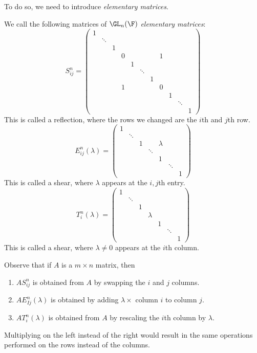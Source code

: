 \documentclass[a4paper]{article}
\begin{document}
To do so, we need to introduce \emph{elementary matrices}.
\begin{defi}
  We call the following matrices of $\GL_n(\F)$ \emph{elementary matrices}:
    \setcounter{MaxMatrixCols}{11}
  \[
    S_{ij}^n =
    \begin{pmatrix}
      1\\
      & \ddots\\
      & & 1\\
      & & & 0 & & & & 1\\
      & & & & 1\\
      & & & & & \ddots\\
      & & & & & & 1\\
      & & & 1 & & & & 0\\
      & & & & & & & & 1\\
      & & & & & & & & & \ddots\\
      & & & & & & & & & & 1
    \end{pmatrix}
  \]
This is called a reflection, where the rows we changed are the $i$th and $j$th row.
  \[
    E_{ij}^n (\lambda) =
    \begin{pmatrix}
      1 \\
      & \ddots \\
      & & 1 & & \lambda\\
      & & & \ddots\\
      & & & & 1\\
      & & & & & \ddots\\
      & & & & & & 1
    \end{pmatrix}
  \]
  This is called a shear, where $\lambda$ appears at the $i,j$th entry.
  \[
    T_{i}^n (\lambda) =
    \begin{pmatrix}
      1 \\
      & \ddots\\
      & & 1 \\
      & & & \lambda\\
      & & & & 1\\
      & & & & & \ddots\\
      & & & & & & 1
    \end{pmatrix}
  \]
  This is called a shear, where $\lambda\not= 0$ appears at the $i$th column.
\end{defi}
Observe that if $A$ is a $m\times n$ matrix, then
\begin{enumerate}
  \item $AS_{ij}^n$ is obtained from $A$ by swapping the $i$ and $j$ columns.
  \item $AE_{Ij}^n(\lambda)$ is obtained by adding $\lambda\times$ column $i$ to column $j$.
  \item $AT_i^n (\lambda)$ is obtained from $A$ by rescaling the $i$th column by $\lambda$.
\end{enumerate}
Multiplying on the left instead of the right would result in the same operations performed on the rows instead of the columns.
\end{document}
